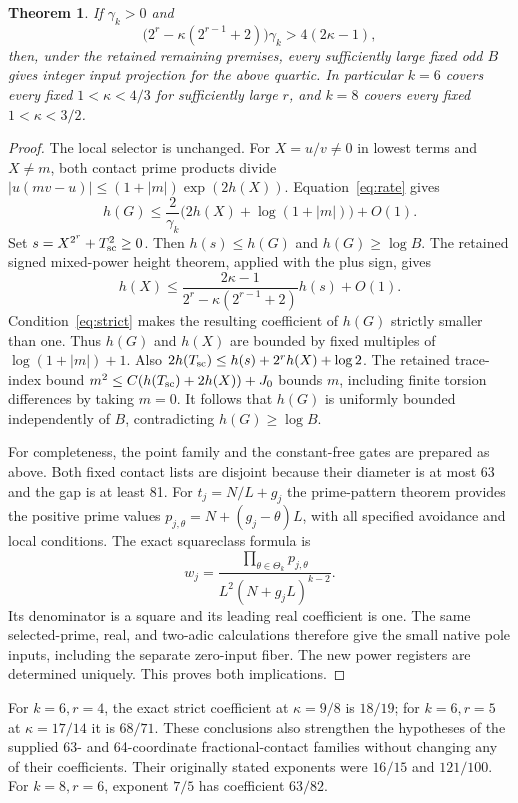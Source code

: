 \documentclass[11pt,a4paper]{article}
\newtheorem{theorem}{Theorem}[section]
\begin{document}
\begin{theorem}\label{thm:weak}
If $\gamma_k>0$ and
\begin{equation}\label{eq:strict}
 \bigl(2^r-\kappa(2^{r-1}+2)\bigr)\gamma_k>4(2\kappa-1),
\end{equation}
then, under the retained remaining premises, every sufficiently large
fixed odd $B$ gives integer input projection for the above quartic.
In particular $k=6$ covers every fixed $1<\kappa<4/3$ for sufficiently
large $r$, and $k=8$ covers every fixed $1<\kappa<3/2$.
\end{theorem}
\begin{proof}
The local selector is unchanged. For $X=u/v\ne0$ in lowest terms and
$X\ne m$, both contact prime products divide
$|u(mv-u)|\le(1+|m|)\exp(2h(X))$. Equation~\eqref{eq:rate} gives
\[
 h(G)\le\frac2{\gamma_k}\bigl(2h(X)+\log(1+|m|)\bigr)+O(1).
\]
Set $s=X^{2^r}+T_{\rm sc}^2\ge0$. Then $h(s)\le h(G)$ and
$h(G)\ge\log B$. The retained signed mixed-power height theorem,
applied with the plus sign, gives
\[
 h(X)\le\frac{2\kappa-1}{2^r-\kappa(2^{r-1}+2)}h(s)+O(1).
\]
Condition~\eqref{eq:strict} makes the resulting coefficient of $h(G)$
strictly smaller than one. Thus $h(G)$ and $h(X)$ are bounded by fixed
multiples of $\log(1+|m|)+1$. Also
$2h(T_{\rm sc})\le h(s)+2^rh(X)+\log2$.
The retained trace-index bound
$m^2\le C(h(T_{\rm sc})+2h(X))+J_0$ bounds $m$, including finite
torsion differences by taking $m=0$. It follows that $h(G)$ is uniformly
bounded independently of $B$, contradicting $h(G)\ge\log B$.

For completeness, the point family and the constant-free gates are
prepared as above. Both fixed contact lists are disjoint because their
diameter is at most 63 and the gap is at least 81. For
$t_j=N/L+g_j$ the prime-pattern theorem provides the positive prime values
$p_{j,\theta}=N+(g_j-\theta)L$, with all specified avoidance and local
conditions. The exact squareclass formula is
\[
 w_j=\frac{\prod_{\theta\in\Theta_k}p_{j,\theta}}
             {L^2(N+g_jL)^{k-2}}.
\]
Its denominator is a square and its leading real coefficient is one.
The same selected-prime, real, and two-adic calculations therefore give
the small native pole inputs, including the separate zero-input fiber.
The new power registers are determined uniquely. This proves both
implications.
\end{proof}

For $k=6,r=4$, the exact strict coefficient at $\kappa=9/8$ is
$18/19$; for $k=6,r=5$ at $\kappa=17/14$ it is $68/71$.
These conclusions also strengthen the hypotheses of the supplied
63- and 64-coordinate fractional-contact families without changing any
of their coefficients. Their originally stated exponents were $16/15$
and $121/100$. For $k=8,r=6$, exponent $7/5$ has coefficient $63/82$.
\end{document}
